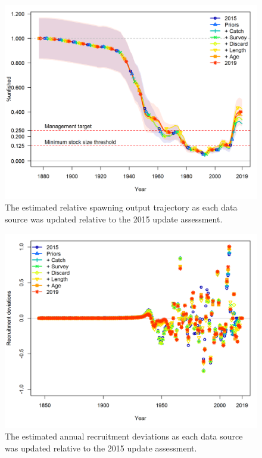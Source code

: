 \documentclass[12pt,]{article}
\begin{document}
\FloatBarrier

\begin{figure}
\centering
\includegraphics{Figures/data_depl.png}
\caption{The estimated relative spawning output trajectory as each data
source was updated relative to the 2015 update assessment.
\label{fig:depl_data}}
\end{figure}

\FloatBarrier

\begin{figure}
\centering
\includegraphics{Figures/data_recdevs.png}
\caption{The estimated annual recruitment deviations as each data source
was updated relative to the 2015 update assessment.
\label{fig:recdev_data}}
\end{figure}
\end{document}
